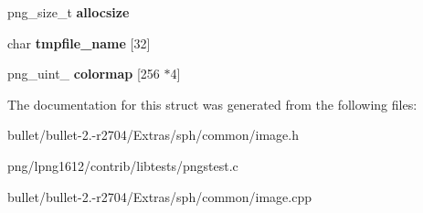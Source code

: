 \begin{DoxyCompactItemize}
\item 
\hypertarget{class_image_a9ada14bcaf1f4d4a39d1bdb164e1e179}{png\+\_\+size\+\_\+t {\bfseries allocsize}}\label{class_image_a9ada14bcaf1f4d4a39d1bdb164e1e179}

\item 
\hypertarget{class_image_aecdcba8871464c0d740dbd36fdace514}{char {\bfseries tmpfile\+\_\+name} \mbox{[}32\mbox{]}}\label{class_image_aecdcba8871464c0d740dbd36fdace514}

\item 
\hypertarget{class_image_a9c22363ea438c660307bdf2391166da0}{png\+\_\+uint\+\_ {\bfseries colormap} \mbox{[}256 $\ast$4\mbox{]}}\label{class_image_a9c22363ea438c660307bdf2391166da0}

\end{DoxyCompactItemize}


The documentation for this struct was generated from the following files\+:\begin{DoxyCompactItemize}
\item 
bullet/bullet-\/2.-\/r2704/\+Extras/sph/common/image.\+h\item 
png/lpng1612/contrib/libtests/pngstest.\+c\item 
bullet/bullet-\/2.-\/r2704/\+Extras/sph/common/image.\+cpp\end{DoxyCompactItemize}
